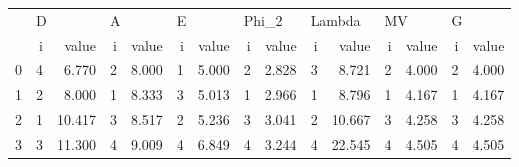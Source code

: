 \begin{tabular}{lrrrrrrrrrrrrrr}
\toprule
{} & \multicolumn{2}{l}{D} & \multicolumn{2}{l}{A} & \multicolumn{2}{l}{E} & \multicolumn{2}{l}{Phi\_2} & \multicolumn{2}{l}{Lambda} & \multicolumn{2}{l}{MV} & \multicolumn{2}{l}{G} \\
{} &  i &   value &  i &  value &  i &  value &     i &  value &      i &   value &  i &  value &  i &  value \\
\midrule
0 &  4 &   6.770 &  2 &  8.000 &  1 &  5.000 &     2 &  2.828 &      3 &   8.721 &  2 &  4.000 &  2 &  4.000 \\
1 &  2 &   8.000 &  1 &  8.333 &  3 &  5.013 &     1 &  2.966 &      1 &   8.796 &  1 &  4.167 &  1 &  4.167 \\
2 &  1 &  10.417 &  3 &  8.517 &  2 &  5.236 &     3 &  3.041 &      2 &  10.667 &  3 &  4.258 &  3 &  4.258 \\
3 &  3 &  11.300 &  4 &  9.009 &  4 &  6.849 &     4 &  3.244 &      4 &  22.545 &  4 &  4.505 &  4 &  4.505 \\
\bottomrule
\end{tabular}
